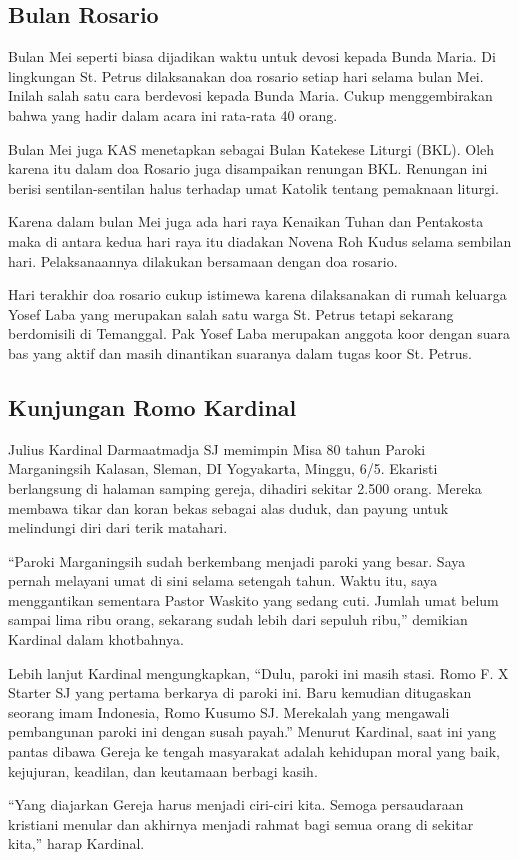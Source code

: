 
\subsection*{Bulan Rosario}
Bulan Mei seperti biasa dijadikan waktu untuk devosi kepada Bunda Maria. Di lingkungan St. Petrus dilaksanakan doa rosario setiap hari selama bulan Mei. Inilah salah satu cara berdevosi kepada Bunda Maria. Cukup menggembirakan bahwa yang hadir dalam acara ini rata-rata 40 orang.

Bulan Mei juga KAS menetapkan sebagai Bulan Katekese Liturgi (BKL). Oleh karena itu dalam doa Rosario juga disampaikan renungan BKL. Renungan ini berisi sentilan-sentilan halus terhadap umat Katolik tentang pemaknaan liturgi.

Karena dalam bulan Mei juga ada hari raya Kenaikan Tuhan dan Pentakosta maka di antara kedua hari raya itu diadakan Novena Roh Kudus selama sembilan hari. Pelaksanaannya dilakukan bersamaan dengan doa rosario. 

Hari terakhir doa rosario cukup istimewa karena dilaksanakan di rumah keluarga Yosef Laba yang merupakan salah satu warga St. Petrus tetapi sekarang berdomisili di Temanggal. Pak Yosef Laba merupakan anggota koor dengan suara bas yang aktif dan masih dinantikan suaranya dalam tugas koor St. Petrus.

\subsection*{Kunjungan Romo Kardinal}
Julius Kardinal Darmaatmadja SJ memimpin Misa 80 tahun Paroki Marganingsih Kalasan, Sleman, DI Yogyakarta, Minggu, 6/5. Ekaristi berlangsung di halaman samping gereja, dihadiri sekitar 2.500 orang. Mereka membawa tikar dan koran bekas sebagai alas duduk, dan payung untuk melindungi diri dari terik matahari.

“Paroki Marganingsih sudah berkembang menjadi paroki yang besar. Saya pernah melayani umat di sini selama setengah tahun. Waktu itu, saya menggantikan sementara Pastor Waskito yang sedang cuti. Jumlah umat belum sampai lima ribu orang, sekarang sudah lebih dari sepuluh ribu,” demikian Kardinal dalam khotbahnya.

Lebih lanjut Kardinal mengungkapkan, “Dulu, paroki ini masih stasi. Romo F. X Starter SJ yang pertama berkarya di paroki ini. Baru kemudian ditugaskan seorang imam Indonesia, Romo Kusumo SJ. Merekalah yang mengawali pembangunan paroki ini dengan susah payah.” Menurut Kardinal, saat ini yang pantas dibawa Gereja ke tengah masyarakat adalah kehidupan moral yang baik, kejujuran, keadilan, dan keutamaan berbagi kasih.

“Yang diajarkan Gereja harus menjadi ciri-ciri kita. Semoga persaudaraan kristiani menular dan akhirnya menjadi rahmat bagi semua orang di sekitar kita,” harap Kardinal.

